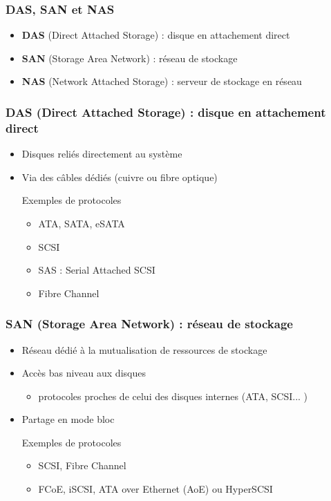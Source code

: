 \begin{frame}
  \frametitle{DAS, SAN et NAS}
  \begin{itemize}
    \item<1> \textbf{DAS} (Direct Attached Storage) : disque en attachement direct
    \item<2> \textbf{SAN} (Storage Area Network) : réseau de stockage
    \item<3> \textbf{NAS} (Network Attached Storage) : serveur de stockage en réseau
  \end{itemize}
\end{frame}

\begin{frame}
  \frametitle{DAS (Direct Attached Storage) : disque en attachement direct}
  \begin{itemize}
    \item Disques reliés directement au système
    \item Via des câbles dédiés (cuivre ou fibre optique)
    \begin{exampleblock}{Exemples de protocoles}
      \begin{itemize}
        \item ATA, SATA, eSATA
        \item SCSI
        \item SAS : Serial Attached SCSI
        \item Fibre Channel
      \end{itemize}
    \end{exampleblock}
  \end{itemize}
\end{frame}

\begin{frame}
  \frametitle{SAN (Storage Area Network) : réseau de stockage}
  \begin{itemize}
    \item Réseau dédié à la mutualisation de ressources de stockage
    \item Accès bas niveau aux disques
    \begin{itemize}
      \item protocoles proches de celui des disques internes (ATA, SCSI... )
    \end{itemize}
    \item Partage en mode bloc
    \begin{exampleblock}{Exemples de protocoles}
      \begin{itemize}
        \item SCSI, Fibre Channel
        \item FCoE, iSCSI, ATA over Ethernet (AoE) ou HyperSCSI
      \end{itemize}
    \end{exampleblock}
  \end{itemize}
\end{frame}

